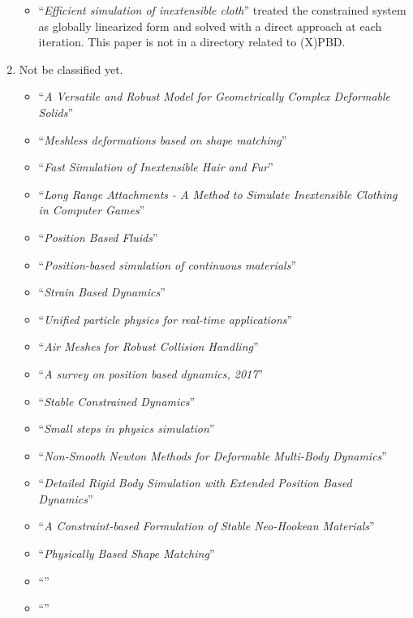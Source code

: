 \documentclass[pdflatex,sn-mathphys-num]{sn-jnl}%
\theoremstyle{thmstyleone}%
\theoremstyle{thmstyletwo}%
\theoremstyle{thmstylethree}%
\newcommand{\pname}[1]{``{\sl #1}''}
\begin{document}
\begin{enumerate}
\begin{itemize}
		\item \pname{Efficient simulation of inextensible cloth}\cite{EfficientGoldenthai} treated the constrained system as globally linearized form and solved with a direct approach at each iteration. This paper is not in a directory related to (X)PBD.
		\end{itemize}
	\item Not be classified yet.
		\begin{itemize}
			\item \pname{A Versatile and Robust Model for Geometrically Complex Deformable Solids}\cite{VersatileTeschner}
			\item \pname{Meshless deformations based on shape matching}\cite{MeshlessMuller2005}
			\item \pname{Fast Simulation of Inextensible Hair and Fur}\cite{InextensibleHair}
			\item \pname{Long Range Attachments - A Method to Simulate Inextensible Clothing in Computer Games}\cite{LongRangeAttachments}
			\item \pname{Position Based Fluids}\cite{PosBaseFluids}
			\item \pname{Position-based simulation of continuous materials}\cite{PBContimuousBENDER2014}
			\item \pname{Strain Based Dynamics}\cite{StrainBasedDyn}
			\item \pname{Unified particle physics for real-time applications}\cite{UnifiedParticle}
			\item \pname{Air Meshes for Robust Collision Handling}\cite{AirMesh}
			\item \pname{A survey on position based dynamics, 2017}\cite{PBDCoursenote}
			\item \pname{Stable Constrained Dynamics}\cite{StableConstrainedDyn}
			\item \pname{Small steps in physics simulation}\cite{SmallSteps}
			\item \pname{Non-Smooth Newton Methods for Deformable Multi-Body Dynamics}\cite{NonSmooth}
			\item \pname{Detailed Rigid Body Simulation with Extended Position Based Dynamics}\cite{DetailedRigidbody}
			\item \pname{A Constraint-based Formulation of Stable Neo-Hookean Materials}\cite{ConstrainedBasedNeo-Hookean}
			\item \pname{Physically Based Shape Matching}\cite{PhysBaseShapeMatching}
			\item \pname{}\cite{}
			\item \pname{}\cite{}

\end{itemize}
\end{enumerate}
\end{document}
